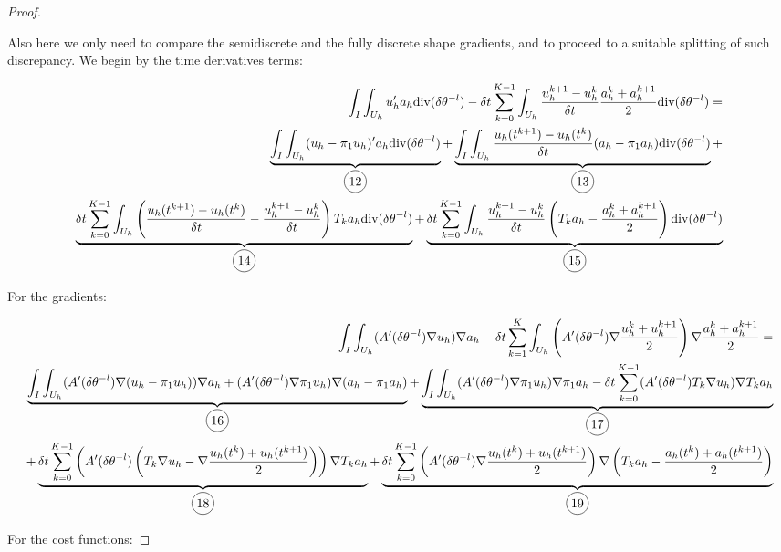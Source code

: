 \documentclass[english,a4paper,9pt,oneside]{scrbook}	%
\theoremstyle{break}
\newenvironment{mproof}[1][\proofname]{%
  \begin{proof}[#1]$ $\par\nobreak\ignorespaces
}{%
  \end{proof}
}
\renewcommand*{\proofname}{Proof}
\theoremstyle{remark}
\newcommand{\te}{\theta}
\newcommand{\dive}{\text{div}}
\newcommand*\circled[1]{\tikz[baseline=(char.base)]{
            \node[shape=circle,draw,inner sep=2pt] (char) {#1};}}
\begin{document}
\begin{mproof}
Also here we only need to compare the semidiscrete and the fully discrete shape gradients, and to proceed to a suitable splitting of such discrepancy. We begin by the time derivatives terms:

\begin{align*}
\int_I\int_{U_h}u_h'a_h\dive(\delta \te^{-l})-\delta t \sum_{k=0}^{K-1} \int_{U_h} \frac{u_h^{k+1}-u_h^{k}}{\delta t}\frac{a_h^k+a_h^{k+1}}{2} \dive(\delta \te^{-l}) =  \\
\underbrace{\int_I\int_{U_h}(u_h-\pi_1 u_h)'a_h\dive(\delta \te^{-l})}_{\circled{12}} + \underbrace{\int_I\int_{U_h}\frac{u_h(t^{k+1})-u_h(t^{k})}{\delta t} (a_h-\pi_1 a_h)\dive(\delta \te^{-l})}_{\circled{13}} +\\
\underbrace{\delta t \sum_{k=0}^{K-1} \int_{U_h}\left (\frac{u_h(t^{k+1})-u_h(t^{k})}{\delta t} - \frac{u_h^{k+1}-u_h^{k}}{\delta t}\right)  T_k a_h   \dive(\delta \te^{-l})}_{\circled{14}} + \underbrace{ \delta t \sum_{k=0}^{K-1} \int_{U_h}\frac{u_h^{k+1}-u_h^{k}}{\delta t} \left ( T_k a_h 
- \frac{a_h^k+a_h^{k+1}}{2}\right )  \dive(\delta \te^{-l})}_{\circled{15}} 
\end{align*}

For the gradients:

\begin{align*}
\int_I \int_{U_h} (A'(\delta \te^{-l})\nabla u_h)\nabla a_h - \delta t \sum_{k=1}^K \int_{U_h} \left(A'(\delta \te^{-l})\nabla \frac{u_h^k+ u_h^{k+1}}{2} \right )\nabla \frac{a_h^{k}+a_h^{k+1}}{2} = \\
\underbrace{\int_I \int_{U_h} (A'(\delta \te^{-l})\nabla (u_h-\pi_1 u_h))\nabla a_h +  (A'(\delta \te^{-l})\nabla \pi_1 u_h)\nabla (a_h-\pi_1 a_h)}_{\circled{16}}+\underbrace{\int_I \int_{U_h} (A'(\delta \te^{-l})\nabla \pi_1 u_h)\nabla \pi_1 a_h- \delta t \sum_{k=0}^{K-1} (A'(\delta \te^{-l})T_k \nabla u_h)\nabla T_k a_h}_{\circled{17}} \\ 
+\underbrace{\delta t \sum_{k=0}^{K-1} \left (A'(\delta \te^{-l})\left ( T_k \nabla u_h - \nabla \frac{u_h(t^{k})+u_h(t^{k+1})}{2}\right) \right )\nabla T_k a_h}_{\circled{18}} + \underbrace{\delta t \sum_{k=0}^{K-1} \left (A'(\delta \te^{-l})\nabla \frac{u_h(t^{k})+u_h(t^{k+1})}{2}\right )\nabla \left ( T_k a_h - \frac{a_h(t^{k})+a_h(t^{k+1})}{2} \right)}_{\circled{19}}
\end{align*}

For the cost functions:



\end{mproof}
\end{document}
